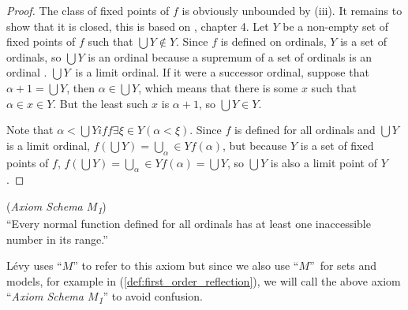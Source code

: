 \begin{proof}
\item The class of fixed points of $f$ is obviously unbounded by (iii).
It remains to show that it is closed, this is based on \cite{DrakeBook}, chapter 4. Let $Y$ be a non-empty set of fixed points of $f$ such that $\bigcup Y \not\in Y$. Since $f$ is defined on ordinals, $Y$ is a set of ordinals, so $\bigcup Y$ is an ordinal because a supremum of a set of ordinals is an ordinal%
. $\bigcup Y$ is a limit ordinal. If it were a successor ordinal, suppose that $\alpha+1 = \bigcup Y$, then $\alpha \in \bigcup Y$, which means that there is some $x$ such that $\alpha \in x \in Y$. But the least such $x$ is $\alpha+1$, so $\bigcup Y \in Y$.

Note that $\alpha < \bigcup Y iff \exists \xi \in Y (\alpha < \xi)$. Since $f$ is defined for all ordinals and $\bigcup Y$ is a limit ordinal, $f(\bigcup Y) = \bigcup_\alpha \in Y f(\alpha)$, but because $Y$ is a set of fixed points of $f$, $f(\bigcup Y) = \bigcup_\alpha \in Y f(\alpha) = \bigcup Y$, so $\bigcup Y$ is also a limit point of $Y$.
\ece
\end{proof}


\begin{definition}{(\emph{Axiom Schema $M$\textsubscript{1}})}\label{def:levy_m}\\
``Every normal function defined for all ordinals has at least one inaccessible number in its range.''
\end{definition}
Lévy uses ``$M$'' to refer to this axiom but since we also use ``$M$'' for sets and models, for example in (\ref{def:first_order_reflection}), we will call the above axiom ``\emph{Axiom Schema $M$\textsubscript{1}}'' to avoid confusion.


